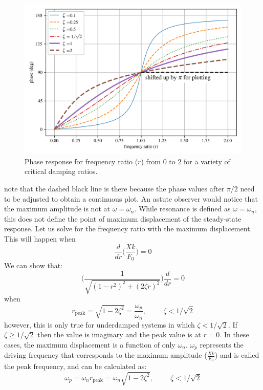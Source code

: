\documentclass[12pt,letter]{article}
\begin{document}
	\begin{figure}[H]
		\centering
		\includegraphics[]{../figures/underdamped_frequency_response_phase.png}
		\caption{Phase response for frequency ratio ($r$) from 0 to 2 for a variety of critical damping ratios.}
		\label{fig:underdamped_frequency_response_phase}
	\end{figure}				
	\noindent note that the dashed black line is there because the phase values after $\pi/2$ need to be adjusted to obtain a continuous plot. An astute observer would notice that the maximum amplitude is not at $\omega = \omega_n$. While resonance is defined as $\omega = \omega_n$, this does not define the point of maximum displacement of the steady-state response. Let us solve for the frequency ratio with the maximum displacement. This will happen when
	\begin{equation}
		\frac{d}{dr}\Bigg(\frac{Xk}{F_0} \Bigg)= 0
	\end{equation}				
	We can show that:
	\begin{equation}
	\Bigg(\frac{1}{\sqrt{(1-r^2)^2+(2\zeta r)^2}}\Bigg)	\frac{d}{dr} =0
	\end{equation}	
	when 
	\begin{equation}
	r_{\text{peak}} = \sqrt{1-2 \zeta^2}= \frac{\omega_p}{\omega_n}, \hspace{1cm} \zeta<1/\sqrt{2} 
	\end{equation}				
	however, this is only true for underdamped systems in which $\zeta<1/\sqrt{2}$. If $\zeta \ge 1/\sqrt{2}$ then the value is imaginary and the peak value is at $r=0$. In these cases, the maximum displacement is a function of only $\omega_n$. $\omega_p$ represents the driving frequency that corresponds to the maximum amplitude ($\frac{Xk}{F_0}$) and is called the peak frequency, and can be calculated as:
	\begin{equation}
	\omega_p = \omega_n r_{\text{peak}} = \omega_n \sqrt{1-2 \zeta^2}, \hspace{1cm} \zeta<1/\sqrt{2} 
	\end{equation}				
	
\end{document}
